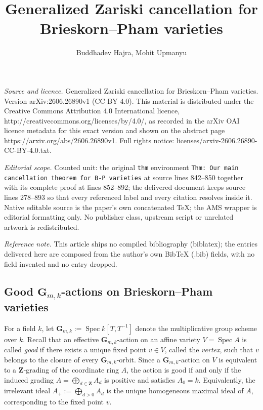 \documentclass[10pt,a4paper]{amsart}
\numberwithin{equation}{section}
\numberwithin{figure}{section}
\numberwithin{equation}{section}
\newcommand{\G}{\mathbf{G}}
\newcommand{\Z}{\mathbf{Z}}
\newcommand{\Spec}{\operatorname{Spec}}
\begin{document}
\title[Generalized Zariski cancellation for Brieskorn--Pham varieti]{Generalized Zariski cancellation for Brieskorn--Pham varieties}
\author{Buddhadev Hajra, Mohit Upmanyu}
\date{}
\maketitle
\noindent\emph{Source and licence.} Generalized Zariski cancellation for Brieskorn--Pham varieties. Version arXiv:2606.26890v1 (CC BY 4.0). This material is distributed under the Creative Commons Attribution 4.0 International licence, http://creativecommons.org/licenses/by/4.0/, as recorded in the arXiv OAI licence metadata for this exact version and shown on the abstract page https://arxiv.org/abs/2606.26890v1. Full rights notice: licenses/arxiv-2606.26890-CC-BY-4.0.txt.\par\smallskip
\noindent\textit{Editorial scope.} Counted unit: the original \texttt{thm} environment \texttt{Thm: Our main cancellation theorem for B-P varieties} at source lines 842--850 together with its complete proof at lines 852--892; the delivered document keeps source lines 278--893 so that every referenced label and every citation resolves inside it. Native editable source is the paper's own concatenated TeX; the AMS wrapper is editorial formatting only. No publisher class, upstream script or unrelated artwork is redistributed.
\par\smallskip\noindent\textit{Reference note.} This article ships no compiled bibliography (biblatex); the entries delivered here are composed from the author's own BibTeX (.bib) fields, with no field invented and no entry dropped.
\subsection{Good $\G_{m,k}$-actions on Brieskorn--Pham varieties}\label{subse2.1}

For a field $k$, let $\G_{m,k}:=\Spec k[T,T^{-1}]$ denote the multiplicative group scheme over $k$. Recall that an effective $\G_{m,k}$-action on an affine variety $V=\Spec A$ is called \emph{good} if there exists a unique fixed point $v\in V$, called the \emph{vertex}, such that $v$ belongs to the closure of every $\G_{m,k}$-orbit. Since a $\G_{m,k}$-action on $V$ is equivalent to a $\Z$-grading of the coordinate ring $A$, the action is good if and only if the induced grading $A=\bigoplus_{d\in\Z}A_d$ is positive and satisfies $A_0=k$. Equivalently, the irrelevant ideal $A_+:=\bigoplus_{d>0}A_d$ is the unique homogeneous maximal ideal of $A$, corresponding to the fixed point $v$.
\end{document}
